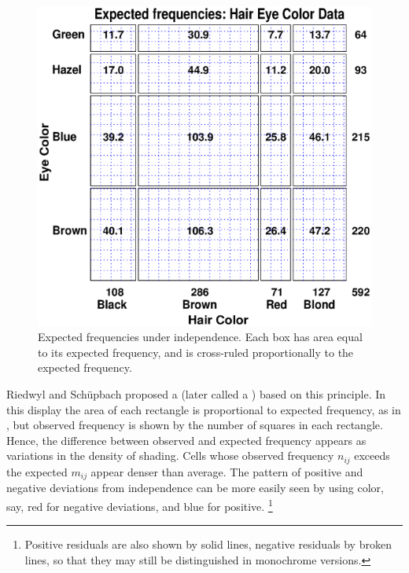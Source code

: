 \begin{figure}[htb]
  \centering
  \includegraphics[scale=.5]{ch3/fig/sieve0}
  \caption[Expected frequencies under independence]{Expected frequencies under independence.  Each box has area equal to its expected frequency, and is cross-ruled proportionally to the expected frequency.}\label{fig:sieve0}
\end{figure}


Riedwyl and Sch\"{u}pbach
\citeyear{RiedwylSchupbach:83,RiedwylSchupbach:94}
proposed a
(later called a ) based on
this principle.  In this display the area of each rectangle is
proportional to expected frequency,
as in ,  but observed frequency is shown by
the number of squares in each rectangle.  Hence, the difference
between observed and expected frequency appears as variations in the density of
shading.
Cells whose observed frequency $n_{ij}$ exceeds the expected $m_{ij}$
appear denser than average.
The pattern of positive and negative deviations from independence
can be more easily seen by
using color, say, red for negative deviations, and blue for positive.%
\footnote{
Positive residuals are also shown by solid lines, negative residuals by broken
lines, so that they may still be distinguished in monochrome versions.}

